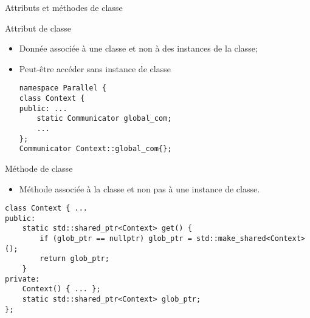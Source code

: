 \documentclass[handout,10pt]{beamer}
\begin{document}
\begin{frame}[fragile]{Attributs et méthodes de classe}
\tiny
\begin{block}{Attribut de classe}
\begin{itemize}
\item Donnée associée à une classe et non à des instances de la classe;
\item Peut-être accéder sans instance de classe
\begin{lstlisting}
namespace Parallel {
class Context {
public: ...
    static Communicator global_com;
    ...
};
Communicator Context::global_com{};
\end{lstlisting}
\end{itemize}
\end{block}
\begin{block}{Méthode de classe}
\begin{itemize}
\item Méthode associée à la classe et non pas à une instance de classe.
\end{itemize}
\begin{lstlisting}
class Context { ...
public:
    static std::shared_ptr<Context> get() {
        if (glob_ptr == nullptr) glob_ptr = std::make_shared<Context>();
        return glob_ptr;
    }
private:
    Context() { ... };
    static std::shared_ptr<Context> glob_ptr;
};
\end{lstlisting}
\end{block}
\end{frame}
\end{document}
